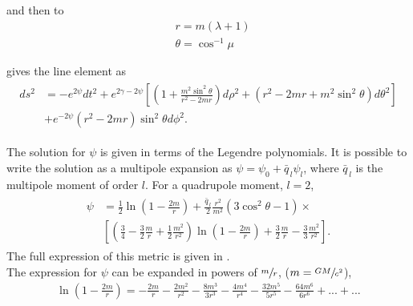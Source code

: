 and then to
\begin{subequations}
\begin{align*}
	&r = m(\lambda + 1)\\
	&\theta = \cos^{-1}\mu
\end{align*}
\end{subequations}

gives the line element as
\begin{align}
\begin{split}
	ds^2 &= -e^{2\psi}dt^2 +  e^{2\gamma -2\psi} \left[\left(1+\frac{m^2\sin^2\theta}{r^2-2mr}\right)d\rho^2 + (r^2-2mr + m^2\sin^2\theta)d\theta^2\right]  \\
&+  e^{-2\psi}(r^2 - 2mr)\sin^2\theta d\phi^2.
\end{split}
\end{align}

The solution for $\psi$ is given in terms of the Legendre polynomials.
It is possible to write the solution as a multipole expansion as $\psi = \psi_0 + \bar{q}_{\, l}\psi_l$, where $\bar{q}_{\, l}$ is the multipole moment of order $l$. For a quadrupole moment, $l = 2$, 
\begin{align}
\begin{split}
	\psi &= \frac{1}{2}\ln\left(1-\frac{2m}{r}\right) + \frac{\bar{q}_{\, l}}{2} \frac{r^2}{m^2} (3\cos^2\theta - 1) \times\\
	& \left[\left(\frac{3}{4} - \frac{3}{2}\frac{m}{r} + \frac{1}{2}\frac{m^2}{r^2}\right)\ln\left(1-\frac{2m}{r}\right) + \frac{3}{2}\frac{m}{r} - \frac{3}{3}\frac{m^2}{r^2}\right].
\end{split}
\end{align}
The full expression of this metric is given in \cite{Brumberg, johnandcoulter}.\\

The expression for $\psi$ can be expanded in powers of $\sfrac{m}{r}$, ($m  = \sfrac{GM}{c^2}$),\\
\begin{align}
	\ln\left(1-\frac{2m}{r}\right) = -\frac{2m}{r}-\frac{2m^2}{r^2}  -\frac{8m^3}{3r^3} -\frac{4m^4}{r^4}-\frac{32m^5}{5r^5} -\frac{64m^6}{6r^6} + ... + ...
\end{align}

